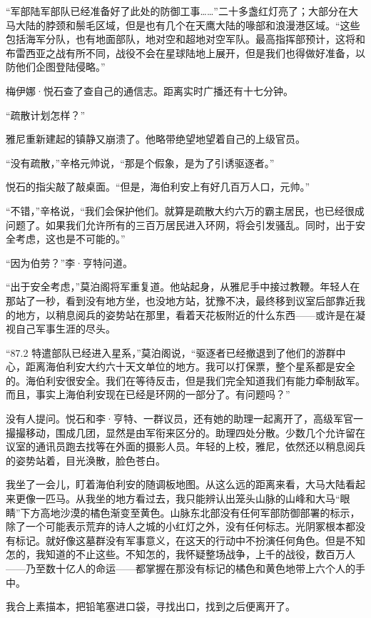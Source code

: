 \documentclass[AutoFakeBold=true]{book}
\begin{document}
``军部陆军部队已经准备好了此处的防御工事……''二十多盏红灯亮了；大部分在大马大陆的脖颈和鬃毛区域，但是也有几个在天鹰大陆的喙部和浪漫港区域。``这些包括海军分队，也有地面部队，地对空和超地对空军队。最高指挥部预计，这将和布雷西亚之战有所不同，战役不会在星球陆地上展开，但是我们也得做好准备，以防他们企图登陆侵略。''

梅伊娜·悦石查了查自己的通信志。距离实时广播还有十七分钟。

``疏散计划怎样？''

雅尼重新建起的镇静又崩溃了。他略带绝望地望着自己的上级官员。

``没有疏散，''辛格元帅说，``那是个假象，是为了引诱驱逐者。''

悦石的指尖敲了敲桌面。``但是，海伯利安上有好几百万人口，元帅。''

``不错，''辛格说，``我们会保护他们。就算是疏散大约六万的霸主居民，也已经很成问题了。如果我们允许所有的三百万居民进入环网，将会引发骚乱。同时，出于安全考虑，这也是不可能的。''

``因为伯劳？''李·亨特问道。

``出于安全考虑，''莫泊阁将军重复道。他站起身，从雅尼手中接过教鞭。年轻人在那站了一秒，看到没有地方坐，也没地方站，犹豫不决，最终移到议室后部靠近我的地方，以稍息阅兵的姿势站在那里，看着天花板附近的什么东西——或许是在凝视自己军事生涯的尽头。

``87.2 特遣部队已经进入星系，''莫泊阁说，``驱逐者已经撤退到了他们的游群中心，距离海伯利安大约六十天文单位的地方。我可以打保票，整个星系都是安全的。海伯利安很安全。我们在等待反击，但是我们完全知道我们有能力牵制敌军。而且，事实上海伯利安现在已经是环网的一部分了。有问题吗？''

没有人提问。悦石和李·亨特、一群议员，还有她的助理一起离开了，高级军官一撮撮移动，围成几团，显然是由军衔来区分的。助理四处分散。少数几个允许留在议室的通讯员跑去找等在外面的摄影人员。年轻的上校，雅尼，依然还以稍息阅兵的姿势站着，目光涣散，脸色苍白。

我坐了一会儿，盯着海伯利安的随调板地图。从这么远的距离来看，大马大陆看起来更像一匹马。从我坐的地方看过去，我只能辨认出笼头山脉的山峰和大马``眼睛''下方高地沙漠的橘色渐变至黄色。山脉东北部没有任何军部防御部署的标示，除了一个可能表示荒弃的诗人之城的小红灯之外，没有任何标志。光阴冢根本都没有标记。就好像这墓群没有军事意义，在这天的行动中不扮演任何角色。但是不知怎的，我知道的不止这些。不知怎的，我怀疑整场战争，上千的战役，数百万人——乃至数十亿人的命运——都掌握在那没有标记的橘色和黄色地带上六个人的手中。

我合上素描本，把铅笔塞进口袋，寻找出口，找到之后便离开了。
\end{document}
